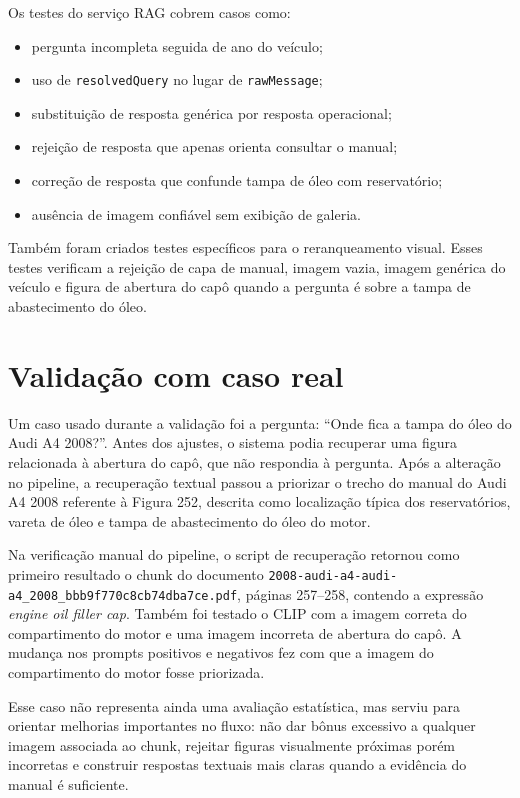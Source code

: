 Os testes do serviço RAG cobrem casos como:

\begin{itemize}
  \item pergunta incompleta seguida de ano do veículo;
  \item uso de \texttt{resolvedQuery} no lugar de \texttt{rawMessage};
  \item substituição de resposta genérica por resposta operacional;
  \item rejeição de resposta que apenas orienta consultar o manual;
  \item correção de resposta que confunde tampa de óleo com reservatório;
  \item ausência de imagem confiável sem exibição de galeria.
\end{itemize}

Também foram criados testes específicos para o reranqueamento visual. Esses testes verificam a rejeição de capa de manual, imagem vazia, imagem genérica do veículo e figura de abertura do capô quando a pergunta é sobre a tampa de abastecimento do óleo.

\section{Validação com caso real}

Um caso usado durante a validação foi a pergunta: ``Onde fica a tampa do óleo do Audi A4 2008?''. Antes dos ajustes, o sistema podia recuperar uma figura relacionada à abertura do capô, que não respondia à pergunta. Após a alteração no pipeline, a recuperação textual passou a priorizar o trecho do manual do Audi A4 2008 referente à Figura 252, descrita como localização típica dos reservatórios, vareta de óleo e tampa de abastecimento do óleo do motor.

Na verificação manual do pipeline, o script de recuperação retornou como primeiro resultado o chunk do documento \texttt{2008-audi-a4-audi-a4\_2008\_bbb9f770c8cb74dba7ce.pdf}, páginas 257--258, contendo a expressão \textit{engine oil filler cap}. Também foi testado o CLIP com a imagem correta do compartimento do motor e uma imagem incorreta de abertura do capô. A mudança nos prompts positivos e negativos fez com que a imagem do compartimento do motor fosse priorizada.

Esse caso não representa ainda uma avaliação estatística, mas serviu para orientar melhorias importantes no fluxo: não dar bônus excessivo a qualquer imagem associada ao chunk, rejeitar figuras visualmente próximas porém incorretas e construir respostas textuais mais claras quando a evidência do manual é suficiente.

